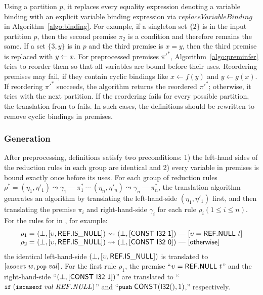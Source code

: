 Using a partition $p$, it replaces every equality expression denoting a variable binding
with an explicit variable binding expression via $\mathit{replaceVariableBinding}$ in Algorithm~\ref{algo:binding}.
For example, if a singleton set $\{2\}$ is in the input partition $p$,
then the second premise $\pi_2$ is a condition and therefore remains the same.
If a set $\{3, y\}$ is in $p$ and the third premise is $x = y$,
then the third premise is replaced with $y \leftarrow x$.
For preprocessed premises $\pi'^*$, Algorithm~\ref{algo:preminfer} tries to reorder them
so that all variables are bound before their uses.
Reordering premises may fail, if they contain cyclic bindings like $x \leftarrow f(y)$ and $y \leftarrow g(x)$.
If reordering $\pi'^*$ succeeds, the algorithm returns the reordered $\pi'^*$;
otherwise, it tries with the next partition.
If the reordering fails for every possible partition, the translation from \dl to \al fails.
In such cases, the \dl definitions should be rewritten to remove cyclic bindings in premises.


\subsubsection{\al Generation}
After preprocessing, \dl definitions satisfy two preconditions:
1) the left-hand sides of the reduction rules in each group
are identical and 2) every variable in premises is bound exactly once before its uses.
For each group of reduction rules $\rho^* =
(\eta_1, \eta' _1)  \leadsto \gamma_1\ \mbox{---}\ \pi_1^*\
\cdots\
(\eta_n, \eta' _n) \leadsto \gamma_n\ \mbox{---}\ \pi_n^*$,
the translation algorithm \dltoil generates an \al algorithm
by translating the left-hand-side $(\eta_1, \eta' _1)$ first,
and then translating the premise $\pi_i$ and right-hand-side $\gamma_i$
for each rule $\rho_i (1\le i\le n)$.
For the rules for \inblue{\ensuremath{\mathsf{ref.is\_null}}} in \dl, for example:
\[
\begin{array}{l@{~}l@{~}c@{~}l}
\rho_1 = &(\bot, [\upsilon, \ssf{REF.IS\_NULL}]) &\leadsto& (\bot, [\ssf{CONST\ I32\ 1}])\
\mbox{---}\ [\upsilon = \ssf{REF.NULL}\ t]\\
\rho_2 = &(\bot, [\upsilon, \ssf{REF.IS\_NULL}])&\leadsto&(\bot, [\ssf{CONST\ I32\ 0}])\
\mbox{---}\ [\ssf{\small otherwise}]
\end{array}
\]
the identical left-hand-side $(\bot, [\upsilon, \mathsf{REF.IS\_NULL}])$
is translated to $[\texttt{\small assert} \; w, \texttt{\small pop} \; \mathit{val}]$.
For the first rule $\rho_1$, the premise ``$\upsilon = \ssf{REF.NULL}\ t$'' and
the right-hand-side ``$(\bot, [\mathsf{CONST\ I32\ 1}])$'' are translated to
``$\texttt{\small if} \; (\texttt{\small iscaseof} \; \mathit{val} \; \mathit{REF.NULL})$'' and
``$\texttt{\small push} \; \mathsf{CONST}(\mathsf{I32}(), 1)$,'' respectively.


